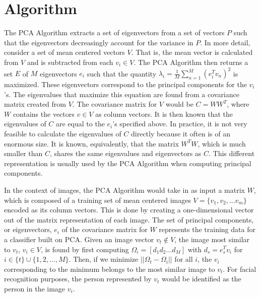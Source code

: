 \documentclass[letterpaper]{article}
\begin{document}
\section{Algorithm}
The PCA Algorithm extracts a set of eigenvectors from a set of vectors $P$ such that the eigenvectors
decreasingly account for the variance in $P$.
In more detail, consider a set of mean centered
vectors $V$. That is, the mean vector is calculated from $V$ and is subtracted from each $v_i \in V$. The PCA Algorithm then returns
a set $E$ of $M$ eigenvectors $e_i$ such that the quantity
\begin{math}
  \lambda_i = \frac{1}{M} \sum_{n=1}^{M}(e_{i}^{T} v_n)^2
\end{math}
is maximized. These eigenvectors correspond to the principal
components for the $v_i$'s. The eigenvalues that maximize this equation are found
from a covariance matrix created from $V$.  The covariance matrix for
$V$ would be $C=WW^T$, where $W$ contains the vectors $v \in V$ as
column vectors. It is then known that the eigenvalues of $C$ are equal to
the $e_i$'s specified above. In practice, it is not very feasible to 
calculate the eigenvalues of $C$ directly because it often is of an enormous size.
It is known, equivalently, that the matrix $W^T W$, which is much smaller than $C$,
shares the same eigenvalues and eigenvectors as $C$. This different representation
is usually used by the PCA Algorithm when computing principal components.

In the context of images, the PCA Algorithm would take in as input a
matrix $W$, which is composed of a training set of mean centered images $V = \{v_1, v_2, \ldots
v_m\}$ encoded as
its column vectors.  This is done by creating a one-dimensional vector
out of the matrix representation of each image. The set of principal
components, or eigenvectors, $e_i$ of the covariance matrix for $W$
represents the training data for a classifier built on PCA.  Given an
image vector $v_t \notin V$, the image most similar to $v_t$, $v_i \in V$, is found by first
computing
\begin{math}
  \Omega_i = \left[ d_1 d_2 \ldots d_M \right]
\end{math} 
with $d_s = e_s^T v_i$ for $i \in \{t\} \cup \{1, 2, \ldots, M \}$. Then, if we minimize
\begin{math}
\left| \left| \Omega_t - \Omega_i \right| \right|
\end{math}
for all $i$, the $v_i$ corresponding to the minimum belongs to the
most similar image to $v_t$. For facial recognition purposes, the 
person represented by $v_t$ would be identified as the person in the
image $v_i$.
\end{document}
